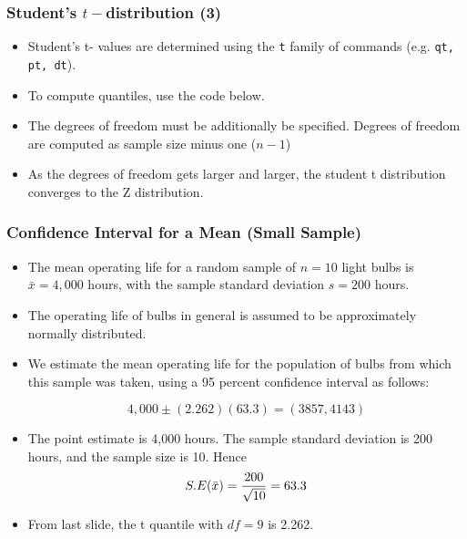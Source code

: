 
\begin{frame}[fragile]
\frametitle{Student's $t-$distribution (3)}

\begin{itemize}
\item Student's t- values are determined using the \texttt{t} family of commands (e.g. \texttt{qt, pt, dt}).
\item To compute quantiles, use the code below.
\item The degrees of freedom must be additionally be specified. Degrees of freedom are computed as sample size minus one ($n-1$)
\item As the degrees of freedom gets larger and larger, the student t distribution converges to the Z distribution.

\end{itemize}

\end{frame}
\begin{frame}
\frametitle{Confidence Interval for a Mean (Small Sample)}
\begin{itemize}
\item The mean operating life for a random sample of $n = 10$ light bulbs is $\bar{x} = 4,000$ hours, with the sample
standard deviation $s = 200$ hours. \item The operating life of bulbs in general is assumed to be approximately normally distributed.\item
We estimate the mean operating life for the population of bulbs from which this sample was taken, using a 95 percent
confidence interval as follows:

\[4,000\pm(2.262)(63.3)  = (3857,4143)\]

\item The point estimate is 4,000 hours. The sample standard deviation is 200 hours, and the sample size is 10. Hence \[S.E(\bar{x} ) = { 200 \over \sqrt{10}} = 63.3\]

\item From last slide, the t quantile with $df=9$ is 2.262.
\end{itemize}
\end{frame}






